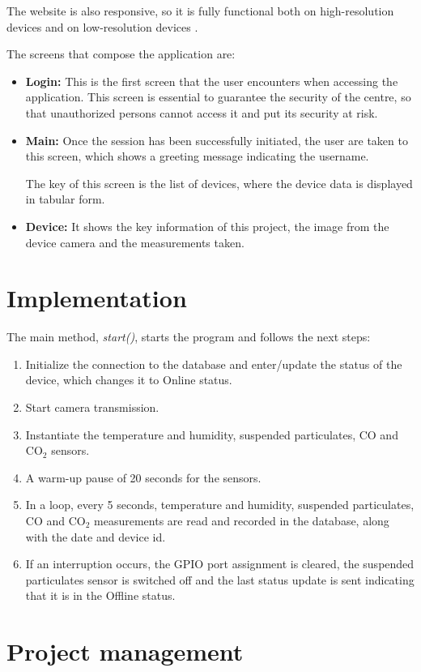 The website is also responsive, so it is fully functional both on high-resolution devices and on low-resolution devices .

The screens that compose the application are:
\begin{itemize}
	\item \textbf{Login:} This is the first screen that the user encounters when accessing the application. This screen is essential to guarantee the security of the centre, so that unauthorized persons cannot access it and put its security at risk.
	\item \textbf{Main:} Once the session has been successfully initiated, the user are taken to this screen, which shows a greeting message indicating the username.

	The key of this screen is the list of devices, where the device data is displayed in tabular form.
	\item \textbf{Device:} It shows the key information of this project, the image from the device camera and the measurements taken.
\end{itemize}

\section{Implementation}\label{sec:implementation}
The main method, \textit{start()}, starts the program and follows the next steps:
\begin{enumerate}
	\item Initialize the connection to the database and enter/update the status of the device, which changes it to Online status.
	\item Start camera transmission.
	\item Instantiate the temperature and humidity, suspended particulates, CO and CO$_2$ sensors.
	\item A warm-up pause of 20 seconds for the sensors.
	\item In a loop, every 5 seconds, temperature and humidity, suspended particulates, CO and CO$_2$ measurements are read and recorded in the database, along with the date and device id.
	\item If an interruption occurs, the GPIO port assignment is cleared, the suspended particulates sensor is switched off and the last status update is sent indicating that it is in the Offline status.
\end{enumerate}

\section{Project management}\label{sec:project-management}
